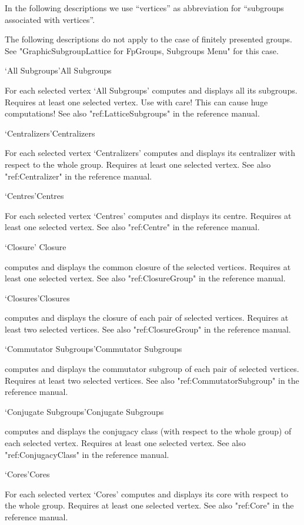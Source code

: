 In the following descriptions   we use ``vertices'' as abbreviation  for
``subgroups associated with vertices''.

The following descriptions do not apply to the case of finitely presented
groups. See "GraphicSubgroupLattice for FpGroups, Subgroups Menu" for this
case. 

\>`All Subgroups'{All Subgroups}

For each selected vertex `All Subgroups' computes and displays all its
subgroups. Requires at least one selected vertex. Use with care! This can
cause huge computations!  See also "ref:LatticeSubgroups" in the {\GAP}
reference manual.

\>`Centralizers'{Centralizers}

For each selected vertex `Centralizers' computes and displays its
centralizer with respect to the whole group.  Requires at least one
selected vertex.  See also "ref:Centralizer" in the {\GAP}
reference manual.

\>`Centres'{Centres}

For each selected vertex `Centres' computes and displays its centre.
Requires at least one selected vertex. See also "ref:Centre" in the {\GAP}
reference manual.

\>`Closure' {Closure}

computes and displays the common closure of the selected vertices.
Requires at least one selected vertex. See also "ref:ClosureGroup" in the
{\GAP} reference manual.

\>`Closures'{Closures}

computes and displays the closure of each pair of selected vertices.
Requires at least two selected vertices. See also "ref:ClosureGroup" in the
{\GAP} reference manual.

\>`Commutator Subgroups'{Commutator Subgroups}

computes and displays  the commutator  subgroup of each pair of selected
vertices.    Requires  at  least    two   selected  vertices. See    also
"ref:CommutatorSubgroup" in the {\GAP}
reference manual.

\>`Conjugate Subgroups'{Conjugate Subgroups}

computes and displays the conjugacy  class (with  respect to the  whole
group) of each  selected vertex.  Requires  at least one selected vertex.
See also "ref:ConjugacyClass" in the {\GAP}
reference manual.

\>`Cores'{Cores}

For each selected vertex `Cores' computes and displays its core with
respect to the whole group.  Requires at least one selected vertex. See
also "ref:Core" in the {\GAP}
reference manual.

